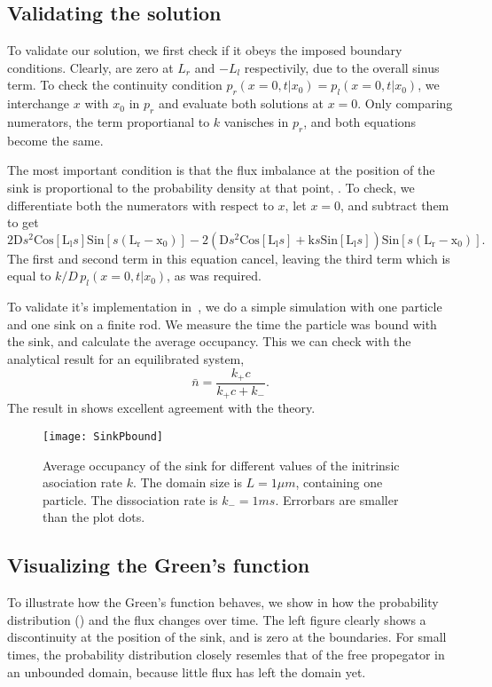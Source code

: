 \subsection{Validating the solution}
To validate our solution, we first check if it obeys the imposed boundary conditions. Clearly,  are zero at $L_r$ and $-L_l$ respectivily, due to the overall sinus term. To check the continuity condition $p_r(x=0,t|x_0)=p_l(x=0,t|x_0)$, we interchange $x$ with $x_0$ in $p_r$ and evaluate both solutions at $x=0$. Only comparing numerators, the term proportianal to $k$ vanisches in $p_r$, and both equations become the same. 

The most important condition is that the flux imbalance at the position of the sink is proportional to the probability density at that point, . To check, we differentiate both the numerators with respect to $x$, let $x=0$, and subtract them to get
\begin{equation}
 2 \mathrm{D} s^2 \mathrm{Cos}[\mathrm{L_l} s] \mathrm{Sin}[s (\mathrm{L_r}-\mathrm{x_0})]-2 \left(\mathrm{D} s^2 \mathrm{Cos}[\mathrm{L_l} s]+\mathrm{k} s \mathrm{Sin}[\mathrm{L_l} s]\right) \mathrm{Sin}[s (\mathrm{L_r}-\mathrm{x_0})].
\end{equation}
The first and second term in this equation cancel, leaving the third term which is equal to $k/D \, p_l(x=0,t|x_0)$, as was required. 

To validate it's implementation in \GFRD\,, we do a simple simulation with one particle and one sink on a finite rod. We measure the time the particle was bound with the sink, and calculate the average occupancy. This we can check with the analytical result for an equilibrated system,
\begin{equation}
\bar{n} = \frac{k_+ c}{k_+ c + k_-}.
\end{equation}
The result in  shows excellent agreement with the theory.

\begin{figure}[th]
\centering
\texttt{[image: SinkPbound]}
\caption{ Average occupancy of the sink for different values of the initrinsic asociation rate $k$. The domain size is $L=1\mu m$, containing one particle. The dissociation rate is $k_-=1ms$. Errorbars are smaller than the plot dots.}
\end{figure}

\subsection{Visualizing the Green's function}
To illustrate how the Green's function behaves, we show in  how the probability distribution () and the flux changes over time. The left figure clearly shows a discontinuity at the position of the sink, and is zero at the boundaries. For small times, the probability distribution closely resemles that of the free propegator in an unbounded domain, because little flux has left the domain yet.

